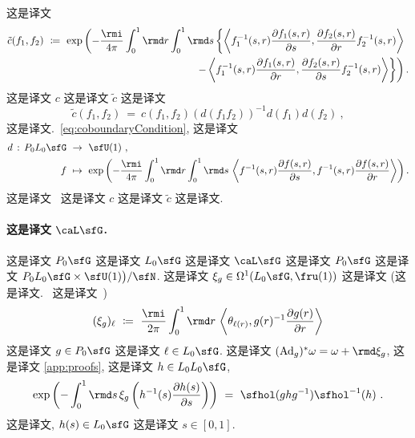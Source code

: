 \documentclass[
    affil-it, %
    auth-lg, %
    british, %
    compression, %
    contents, %
    custom-packages={}, %
    references={bigone}, %
]{lib/preprint}
\begin{document}
\begin{body}
 这是译文~\cite{Mickelsson:1987:173-183}         \begin{equation}
            \begin{aligned}
                \tilde c(f_1,f_2)\ &\coloneqq\ \exp\left(-\frac{\rmi}{4\pi}\int_0^1\rmd r\int_0^1\rmd s\left\{\innerLarge{f_1^{-1}(s,r)\parder[f_1(s,r)]{s}}{\parder[f_2(s,r)]{r}f_2^{-1}(s,r)}\right.\right.
                \\
                &\kern5cm\left.\left.-\innerLarge{f_1^{-1}(s,r)\parder[f_1(s,r)]{r}}{\parder[f_2(s,r)]{s}f_2^{-1}(s,r)}\right\}\right).
            \end{aligned}
        \end{equation}  这是译文 $c$ 这是译文 $\tilde c$ 这是译文         \begin{equation}\label{eq:coboundaryDifferentGroupCocycles}
            \tilde c(f_1,f_2)\ =\ c(f_1,f_2)(d(f_1f_2))^{-1}d(f_1)d(f_2)~,
        \end{equation}  这是译文.~\eqref{eq:coboundaryCondition}, 这是译文 
        \begin{equation}
            \begin{aligned}
                d\,:\,P_0L_0\sfG\ &\rightarrow\ \sfU(1)~,
                \\
                f\ &\mapsto\ \exp\left(-\frac{\rmi}{4\pi}\int_{0}^{1}\rmd r\int_0^1\rmd s\,\innerLarge{f^{-1}(s,r)\parder[f(s,r)]{s}}{f^{-1}(s,r)\parder[f(s,r)]{r}}\right).
            \end{aligned}
        \end{equation}  这是译文~\cite{Murray:1987ua} 这是译文 $c$ 这是译文 $\tilde c$ 这是译文.

        \paragraph{这是译文 $\caL\sfG$.}  这是译文 $P_0\sfG$ 这是译文 $L_0\sfG$ 这是译文 $\caL\sfG$ 这是译文 $P_0\sfG$ 这是译文 $P_0L_0\sfG\times\sfU(1)\big)/\sfN$. 这是译文 $\xi_g\in\Omega^1(L_0\sfG,\fru(1))$ 这是译文 (这是译文.~\cite{Baez:2005sn} 这是译文~\cite[Section 4]{Pressley:1988qk})         \begin{equation}\label{eq:Baez1Form}
            (\xi_g)_\ell\ \coloneqq\ \frac{\rmi}{2\pi}\int_0^{1}\rmd r\,\innerLarge{\theta_{\ell(r)}}{g(r)^{-1}\parder[g(r)]{r}}
        \end{equation}  这是译文 $g\in P_0\sfG$ 这是译文 $\ell\in L_0\sfG$. 这是译文 $(\Ad_g)^*\omega=\omega+\rmd \xi_g$, 这是译文 \cref{app:proofs}, 这是译文 $h\in L_0L_0\sfG$,         \begin{equation}\label{eq:simp_loops}
            \exp\left(-\int_0^1\rmd s\,\xi_g\left(h^{-1}(s)\parder[h(s)]{s}\right)\right)\ =\ \sfhol(ghg^{-1})\sfhol^{-1}(h)~.
        \end{equation}  这是译文, $h(s)\in L_0\sfG$ 这是译文 $s\in[0,1]$. 


\end{body}
\end{document}
